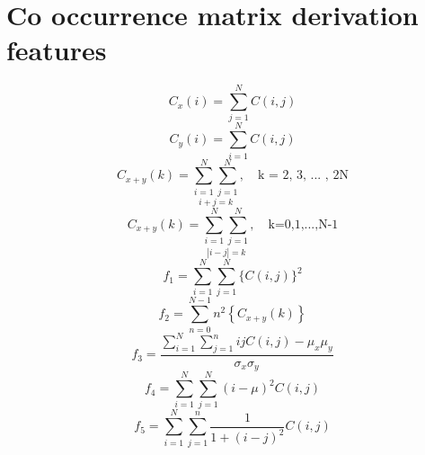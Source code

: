 \chapter{Co occurrence matrix derivation features}

\[
C_x(i) = \sum_{j=1}^{N}C(i,j)
\]
\[
C_y(i) = \sum_{i=1}^{N}C(i,j)
\]
\[
C_{x+y}(k) = \underset{i+j=k}{\sum_{i=1}^{N}\sum_{j=1}^{N}}, \quad \text{k = 2, 3, ... , 2N}
\]
\[
C_{x+y}(k) = \underset{|i-j|=k}{\sum_{i=1}^{N}\sum_{j=1}^{N}}, \quad \text{k=0,1,...,N-1}
\]
\begin{equation}\label{AngularSecondMoment}
  f_1 = \sum_{i=1}^{N}\sum_{j=1}^{N}\{C(i,j)\}^2
\end{equation}
\begin{equation}\label{Contrast}
  f_2 = \sum_{n=0}^{N-1} n^2 \left\{C_{x+y}(k)\right\}
\end{equation}
\begin{equation}\label{Correlation}
  f_3 = \frac{\sum_{i=1}^{N}\sum_{j=1}^{n} i j C(i,j) - \mu_x \mu_y}{\sigma_x\sigma_y}
\end{equation}
\begin{equation}\label{Variance}
  f_4 = \sum_{i=1}^{N}\sum_{j=1}^{N}(i-\mu)^2 C(i,j)
\end{equation}
\begin{equation}\label{InverseDifferenceMoment}
  f_5 = \sum_{i=1}^{N}\sum_{j=1}^{n} \frac{1}{1+(i-j)^2} C(i,j)
\end{equation}
